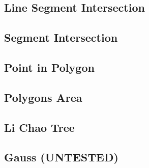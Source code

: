 \subsection{Line Segment Intersection}
\raggedbottom
\hrulefill
\subsection{Segment Intersection}
\raggedbottom
\hrulefill
\subsection{Point in Polygon}
\raggedbottom
\hrulefill
\subsection{Polygons Area}
\raggedbottom
\hrulefill
\subsection{Li Chao Tree}
\raggedbottom
\hrulefill
\subsection{Gauss (UNTESTED)}
\raggedbottom
\hrulefill

